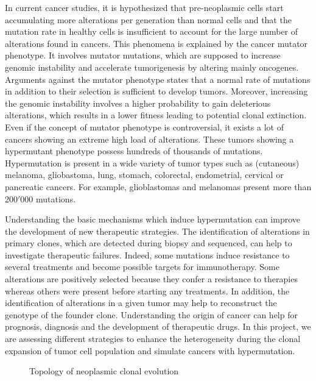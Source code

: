 \documentclass[a4paper]{article}
\begin{document}
\begin{multicols}{2}
In current cancer studies, it is hypothesized that pre-neoplasmic cells start accumulating more alterations per generation than normal cells and that the mutation rate in healthy cells is insufficient to account for the large number of alterations found in cancers\cite{RG, FPL}. This phenomena is explained by the cancer mutator phenotype. It involves mutator mutations, which are supposed to increase genomic instability and accelerate tumorigenesis by altering mainly oncogenes\cite{BL2, B}. Arguments against the mutator phenotype states that a normal rate of mutations in addition to their selection is sufficient to develop tumors. Moreover, increasing the genomic instability involves a higher probability to gain deleterious alterations, which results in a lower fitness leading to potential clonal extinction\cite{B}. Even if the concept of mutator phenotype is controversial, it exists a lot of cancers showing an extreme high load of alterations. These tumors showing a hypermutant phenotype possess hundreds of thousands of mutations\cite{GM, SE}. Hypermutation is present in a wide variety of tumor types such as (cutaneous) melanoma, gliobastoma, lung, stomach, colorectal, endometrial, cervical or pancreatic cancers\cite{RG, SE}. For example, glioblastomas and melanomas present more than $200'000$ mutations\cite{FPL}. 

Understanding the basic mechanisms which induce hypermutation can improve the development of new therapeutic strategies. The identification of alterations in primary clones, which are detected during biopsy and sequenced, can help to investigate therapeutic failures. Indeed, some mutations induce resistance to several treatments and become possible targets for immunotherapy. Some alterations are positively selected because they confer a resistance to therapies whereas others were present before starting any treatments. In addition, the identification of alterations in a given tumor may help to reconstruct the genotype of the founder clone. Understanding the origin of cancer can help for prognosis, diagnosis and the development of therapeutic drugs. In this project, we are assessing different strategies to enhance the heterogeneity during the clonal expansion of tumor cell population and simulate cancers with hypermutation.

\end{multicols}
\begin{figure}[b]
	\centering
	\caption{Topology of neoplasmic clonal evolution}
	\label{Topology}
\end{figure}
\end{document}
